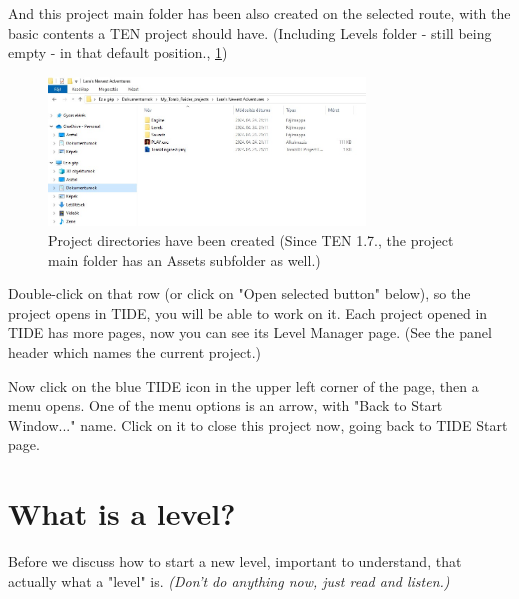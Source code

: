 \par And this project main folder has been also created on the selected route, with the basic contents a TEN project should have. (Including Levels folder - still being empty - in that default position., \ref{fig:tide4})

\begin{figure}
    \centering
     \includegraphics[width=0.75\textwidth]{screenshots/4.jpg}
     \caption{Project directories have been created (Since TEN 1.7., the project main folder has an Assets subfolder as well.)}
     \label{fig:tide4}
\end{figure}

Double-click on that row (or click on "Open selected button" below), so the project opens in TIDE, you will be able to work on it. Each project opened in TIDE has more pages, now you can see its Level Manager page. (See the panel header which names the current project.)
\par Now click on the blue TIDE icon in the upper left corner of the page, then a menu opens. One of the menu options is an arrow, with "Back to Start Window..." name. Click on it to close this project now, going back to TIDE Start page.
\cite{akyv_tutorial}

\chapter{What is a level?}
Before we discuss how to start a new level, important to understand, that actually what a "level" is.
\emph{(Don't do anything now, just read and listen.)}
